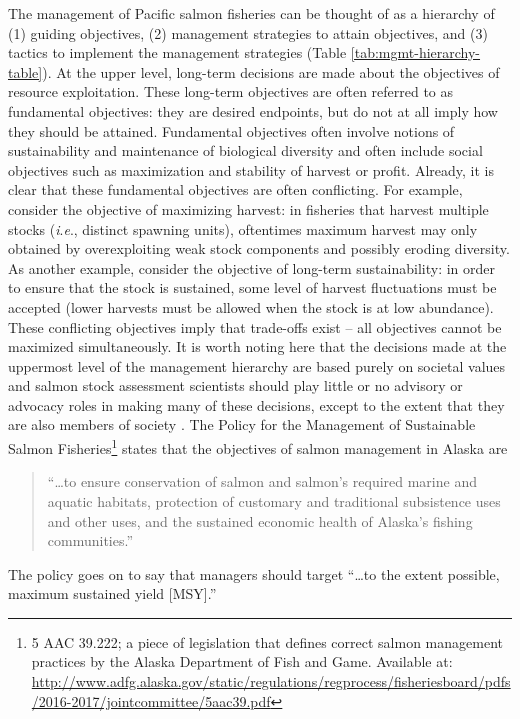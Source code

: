 \documentclass[12pt,]{book}
\let\rmarkdownfootnote\footnote%
\def\footnote{\protect\rmarkdownfootnote}
\theoremstyle{definition}
\theoremstyle{definition}
\theoremstyle{definition}
\theoremstyle{remark}
\begin{document}
The management of Pacific salmon fisheries can be thought of as a
hierarchy of (1) guiding objectives, (2) management strategies to attain
objectives, and (3) tactics to implement the management strategies
(Table \ref{tab:mgmt-hierarchy-table}). At the upper level, long-term
decisions are made about the objectives of resource exploitation. These
long-term objectives are often referred to as fundamental objectives:
they are desired endpoints, but do not at all imply how they should be
attained. Fundamental objectives often involve notions of sustainability
and maintenance of biological diversity and often include social
objectives such as maximization and stability of harvest or profit.
Already, it is clear that these fundamental objectives are often
conflicting. For example, consider the objective of maximizing harvest:
in fisheries that harvest multiple stocks (\emph{i}.\emph{e}., distinct
spawning units), oftentimes maximum harvest may only obtained by
overexploiting weak stock components and possibly eroding diversity. As
another example, consider the objective of long-term sustainability: in
order to ensure that the stock is sustained, some level of harvest
fluctuations must be accepted (lower harvests must be allowed when the
stock is at low abundance). These conflicting objectives imply that
trade-offs exist -- all objectives cannot be maximized simultaneously.
It is worth noting here that the decisions made at the uppermost level
of the management hierarchy are based purely on societal values and
salmon stock assessment scientists should play little or no advisory or
advocacy roles in making many of these decisions, except to the extent
that they are also members of society \citep{walters-martell-2004}. The
Policy for the Management of Sustainable Salmon Fisheries\footnote{5 AAC
  39.222; a piece of legislation that defines correct salmon management
  practices by the Alaska Department of Fish and Game. Available at:
  \url{http://www.adfg.alaska.gov/static/regulations/regprocess/fisheriesboard/pdfs/2016-2017/jointcommittee/5aac39.pdf}}
states that the objectives of salmon management in Alaska are

\begin{quote}
``\ldots{}to ensure conservation of salmon and salmon's required marine
and aquatic habitats, protection of customary and traditional
subsistence uses and other uses, and the sustained economic health of
Alaska's fishing communities.''
\end{quote}

\noindent
The policy goes on to say that managers should target ``\ldots{}to the
extent possible, maximum sustained yield {[}MSY{]}.''
\end{document}
